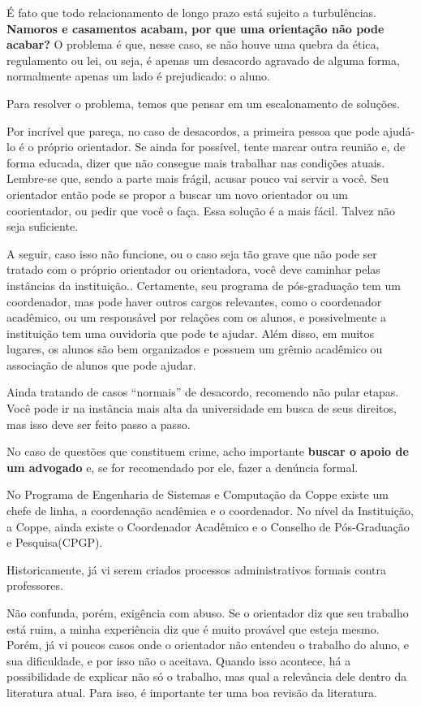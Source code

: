 É fato que todo relacionamento de longo prazo está sujeito a turbulências. \textbf{Namoros e casamentos acabam, por que uma orientação não pode acabar?} 
O problema é que, nesse caso, se não houve uma quebra da ética, regulamento ou lei, ou seja, é apenas um desacordo agravado de alguma forma, normalmente apenas um lado é prejudicado: o aluno.

Para resolver o problema, temos que pensar em um escalonamento de soluções. 

Por incrível que pareça, no caso de desacordos, a primeira pessoa que pode ajudá-lo é o próprio orientador. 
Se ainda for possível, tente marcar outra reunião e, de forma educada, dizer que não consegue mais trabalhar nas condições atuais. 
Lembre-se que, sendo a parte mais frágil, acusar pouco vai servir a você. 
Seu orientador então pode se propor a buscar um novo orientador ou um coorientador, ou pedir que você o faça. 
Essa solução é a mais fácil. Talvez não seja suficiente.

A seguir, caso isso não funcione, ou o caso seja tão  grave que não pode ser tratado com o próprio orientador ou orientadora, você deve caminhar pelas instâncias da instituição.. 
Certamente, seu programa de pós-graduação tem um coordenador, mas pode haver outros cargos relevantes, como o coordenador acadêmico, ou um responsável por relações com os alunos, e possivelmente a instituição tem uma ouvidoria que pode te ajudar. 
Além disso, em muitos lugares, os alunos são bem organizados e possuem um grêmio acadêmico ou associação de alunos que pode ajudar. 

Ainda tratando de casos ``normais'' de desacordo, recomendo não pular etapas. Você pode ir na instância mais alta da universidade em busca de seus direitos, mas isso deve ser feito passo a passo.

No caso de questões que constituem crime, acho importante \textbf{buscar o apoio de um advogado} e, se for recomendado por ele, fazer a denúncia formal. 

{
No Programa de Engenharia de Sistemas e Computação da  Coppe existe um chefe de linha, a coordenação acadêmica e o coordenador. 
No nível da Instituição, a Coppe, ainda existe o Coordenador Acadêmico e o Conselho de Pós-Graduação e Pesquisa(CPGP). 

Historicamente, já vi serem criados processos administrativos formais contra professores.
}

Não confunda, porém, exigência com abuso. Se o orientador diz que seu trabalho está ruim, a minha experiência diz que é muito provável que esteja mesmo. 
Porém, já vi poucos casos onde o orientador não entendeu o trabalho do aluno, e sua dificuldade, e por isso não o aceitava. 
Quando isso acontece, há a possibilidade de explicar não só o trabalho, mas qual a relevância dele dentro da literatura atual. Para isso, é importante ter uma boa revisão da literatura.





